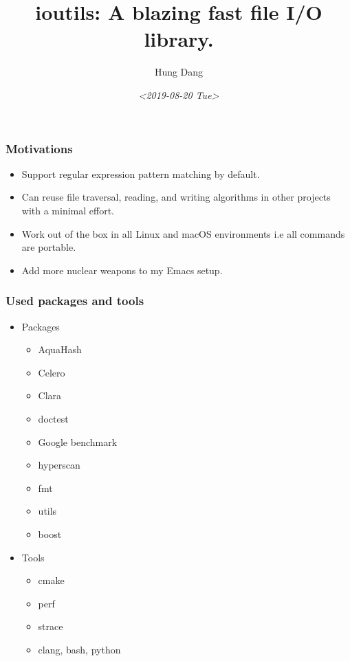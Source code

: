 \documentclass[bigger]{beamer}
\author{Hung Dang}
\date{\textit{<2019-08-20 Tue>}}
\title{ioutils: A blazing fast file I/O library.}
\begin{document}
\maketitle

\begin{frame}
    \frametitle{Motivations}
    \begin{itemize}
        \pause
    \item Support regular expression pattern matching by default.
        \pause
    \item Can reuse file traversal, reading, and writing algorithms in
        other projects with a minimal effort.
        \pause
    \item Work out of the box in all Linux and macOS environments i.e
        all commands are portable.
        \pause
    \item Add more nuclear weapons to my Emacs setup.
    \end{itemize}
\end{frame}

\begin{frame}
    \frametitle{Used packages and tools}
    \begin{itemize}
    \item Packages
        \begin{itemize}
        \item AquaHash
        \item Celero
        \item Clara
        \item doctest
        \item Google benchmark
        \item hyperscan
        \item fmt
        \item utils
        \item boost
        \end{itemize}
    \item Tools
        \begin{itemize}
        \item cmake
        \item perf
        \item strace
        \item clang, bash, python
        \end{itemize}
    \end{itemize}
\end{frame}
\end{document}
